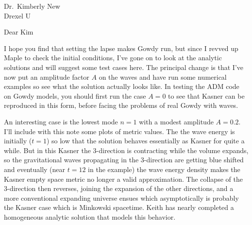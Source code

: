 %
%
%
%
%
%
\signature{Charlie
}

\def\half{\mbox{$\frac{1}{2}$}}     %
\def\ref#1{}




\begin{letter}{%
Dr.\ Kimberly New\\
Drexel U
}


\opening{Dear Kim}

    I hope you find that setting the lapse makes Gowdy run, but since
I revved up Maple to check the initial conditions, I've gone on to
look at the analytic solutions and will suggest some test cases here.
    The principal change is that I've now put an amplitude factor $A$
on the waves and have run some numerical examples so see what the
solution actually looks like.  
    In testing the ADM code on Gowdy models, you should first run the
case $A=0$ to see that Kasner can be reproduced in this form, before
facing the problems of real Gowdy with waves.

    An interesting case is the lowest mode $n=1$ with a modest
amplitude $A = 0.2$.  
    I'll include with this note some plots of metric values. 
    The the wave energy is initially ($t=1$)  so low that the
solution behaves essentially as Kasner for quite a while.  
    But in this Kasner the 3-direction is contracting while the
volume expands, so the gravitational waves propagating in the
3-direction are getting blue shifted and eventually (near $t=12$ in
the example) the wave energy density makes the Kasner empty space
metric no longer a valid approximation.  
    The collapse of the 3-direction then reverses, joining the
expansion of the other directions, and a more conventional expanding
universe ensues which asymptotically is probably the Kasner case
which is Minkowski spacetime.
    Keith has nearly completed a homogeneous analytic solution that
models this behavior.


\end{letter}
